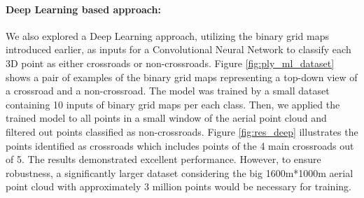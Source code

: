\documentclass[11pt]{article}
\begin{document}
    \paragraph{Deep Learning based approach:}
    We also explored a Deep Learning approach, utilizing the binary grid maps introduced earlier, as inputs for a
    Convolutional Neural Network to classify each 3D point as either crossroads or non-crossroads. Figure \ref{fig:ply_ml_dataset}
    shows a pair of examples of the binary grid maps representing a top-down view of a crossroad and a non-crossroad.
    The model was trained by a small dataset containing 10 inputs of binary grid maps per each class.
    Then, we applied the trained model to all points in a small window of the aerial point cloud and filtered out
    points classified as non-crossroads. Figure \ref{fig:res_deep} illustrates the points identified
    as crossroads which includes points of the 4 main crossroads out of 5. The results demonstrated excellent performance.
    However, to ensure robustness, a significantly larger dataset considering the big 1600m*1000m aerial point cloud
    with approximately 3 million points would be necessary for training.
\end{document}
